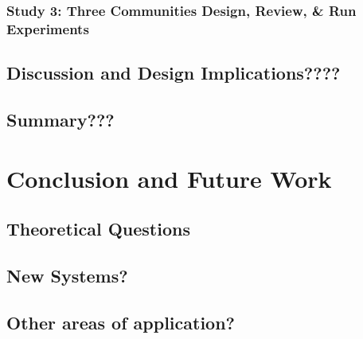 \subsection{Study 3: Three Communities Design, Review, \& Run Experiments}

\section{Discussion and Design Implications????}
\section{Summary???}

\chapter{Conclusion and Future Work}

\section{Theoretical Questions}

\section{New Systems?}

\section{Other areas of application?}




